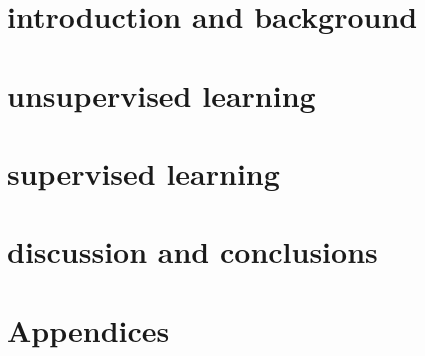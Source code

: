 \documentclass[\classfontsize,\papersize,twoside,showtrims,extrafontsizes]{memoir}  %
\begin{document}
\prefrontmatter

\cleartoevenpage

\cleartooddpage

\cleartoevenpage

\frontmatter







\clearforchapter
\printglossary[title=Abbreviations, toctitle=abbrevations, type=\acronymtype]

\clearforchapter
\printnomenclature
{}

\clearforchapter
\listoffigures*
{}

\clearforchapter
\listoftables*
{}

\clearforchapter
\tableofcontents*

\clearforchapter
\mylistoftodos

\mainmatter

\part[introduction and background]{introduction and background}




\part[unsupervised learning]{unsupervised learning}




\part[supervised learning]{supervised learning}

\part[discussion and conclusions]{discussion and conclusions}



\part[Appendices]{Appendices}
\appendix



\backmatter
\printbibliography
\end{document}
